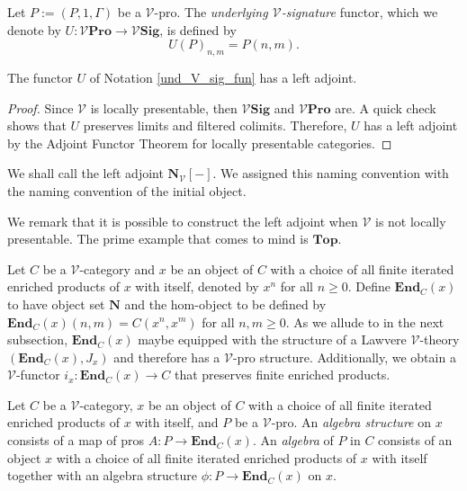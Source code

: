 \documentclass{tac}
\begin{document}
\begin{notation}\label{und_V_sig_fun}
  Let $P:=(P,1,\Gamma)$ be a $\mathcal{V}$-pro. The \emph{underlying $\mathcal{V}$-signature} functor, which we denote by $U:\mathcal{V}\mathbf{Pro}\to\mathcal{V}\mathbf{Sig}$, is defined by
\[
U(P)_{n,m}=P(n,m).
\]  
\end{notation}

\begin{lemma}\label{left_adjoint_for_V_Pro_exists}
 The functor $U$ of Notation \ref{und_V_sig_fun} has a left adjoint.
\end{lemma}

\begin{proof}
Since $\mathcal{V}$ is locally presentable, then $\mathcal{V}\mathbf{Sig}$ and $\mathcal{V}\mathbf{Pro}$ are. A quick check shows that $U$ preserves limits and filtered colimits. Therefore, $U$ has a left adjoint by the Adjoint Functor Theorem for locally presentable categories.
\end{proof}

 We shall call the left adjoint $\mathbf{N}_{\mathcal{V}}[-]$. We assigned this naming convention with the naming convention of the initial object. 
 
 \begin{remark}
     We remark that it is possible to construct the left adjoint when $\mathcal{V}$ is not locally presentable. The prime example that comes to mind is $\mathbf{Top}$. 
 \end{remark}

 

\begin{construction}
Let $C$ be a $\mathcal{V}$-category and $x$ be an object of $C$ with a choice of all finite iterated enriched products of $x$ with itself, denoted by $x^n$ for all $n\geq 0$. Define $\mathbf{End}_C(x)$ to have object set $\mathbf{N}$ and the hom-object to be defined by $\mathbf{End}_C(x)(n,m)=C(x^n,x^m)$ for all $n,m\geq 0$. As we allude to in the next subsection, $\mathbf{End}_C(x)$ maybe equipped with the structure of a Lawvere $\mathcal{V}$-theory $(\mathbf{End}_C(x),J_x)$ and therefore has a $\mathcal{V}$-pro structure. Additionally, we obtain a $\mathcal{V}$-functor $i_x:\mathbf{End}_C(x)\to C$ that preserves finite enriched products.
\end{construction}

\begin{definition}
Let $C$ be a $\mathcal{V}$-category, $x$ be an object of $C$ with a choice of all finite iterated enriched products of $x$ with itself, and $P$ be a $\mathcal{V}$-pro. An \emph{algebra structure} on $x$ consists of a map of pros $A:P\to \mathbf{End}_C(x)$. An \emph{algebra} of $P$ in $C$ consists of an object $x$ with a choice of all finite iterated enriched products of $x$ with itself together with an algebra structure $\phi:P\to \mathbf{End}_C(x)$ on $x$.
\end{definition}
\end{document}
